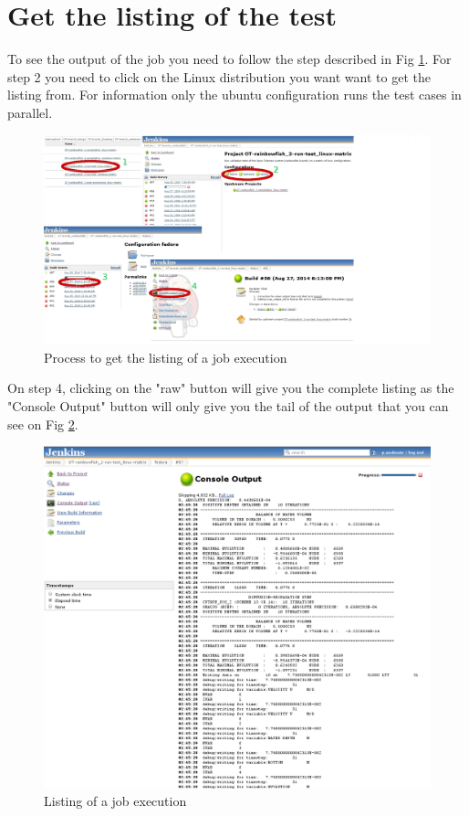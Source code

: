 \section{Get the listing of the test}
%
%
To see the output of the job you need to follow the step described in Fig
\ref{fig:cis-to-listing}. For step 2 you need to click on the Linux
distribution you want want to get the listing from.  For information only the
ubuntu configuration runs the test cases in parallel.
%
\begin{figure}[H]
    \centering
    \includegraphics[scale=0.3]{graphics/cis-to-listing.jpg}
    \caption{Process to get the listing of a job execution}
    \label{fig:cis-to-listing}
\end{figure}
%
On step 4, clicking on the "raw" button will give you the complete listing as
the "Console Output" button will only give you the tail of the output that you
can see on Fig \ref{fig:cis-listing}.
%
\begin{figure}[H]
    \centering
    \includegraphics[scale=0.35]{graphics/cis-listing.png}
    \caption{Listing of a job execution}
    \label{fig:cis-listing}
\end{figure}
%

